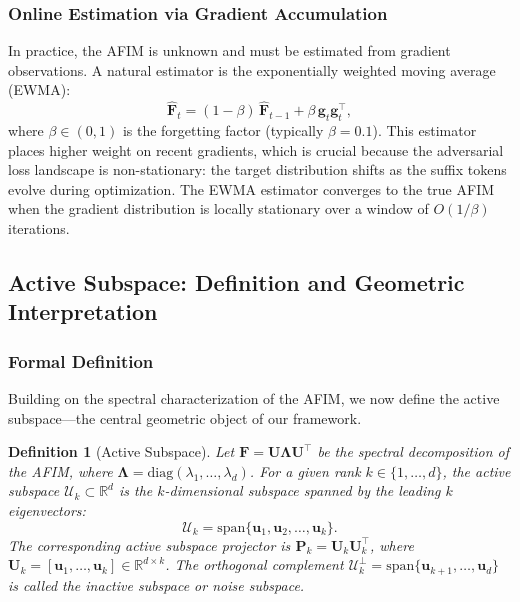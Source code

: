 \documentclass[preprint,12pt]{elsarticle}
\newtheorem{definition}{Definition}[section]
\begin{document}
\subsubsection{Online Estimation via Gradient Accumulation}

In practice, the AFIM is unknown and must be estimated from gradient observations. A natural estimator is the exponentially weighted moving average (EWMA):
\begin{equation}
\label{eq:ewma}
\hat{\mathbf{F}}_t = (1 - \beta) \, \hat{\mathbf{F}}_{t-1} + \beta \, \mathbf{g}_t \mathbf{g}_t^\top,
\end{equation}
where $\beta \in (0, 1)$ is the forgetting factor (typically $\beta = 0.1$). This estimator places higher weight on recent gradients, which is crucial because the adversarial loss landscape is non-stationary: the target distribution shifts as the suffix tokens evolve during optimization. The EWMA estimator converges to the true AFIM when the gradient distribution is locally stationary over a window of $O(1/\beta)$ iterations.

\subsection{Active Subspace: Definition and Geometric Interpretation}
\label{sec:active_subspace}

\subsubsection{Formal Definition}

Building on the spectral characterization of the AFIM, we now define the active subspace---the central geometric object of our framework.

\begin{definition}[Active Subspace]
\label{def:active_subspace}
Let $\mathbf{F} = \mathbf{U} \boldsymbol{\Lambda} \mathbf{U}^\top$ be the spectral decomposition of the AFIM, where $\boldsymbol{\Lambda} = \text{diag}(\lambda_1, \ldots, \lambda_d)$. For a given rank $k \in \{1, \ldots, d\}$, the \emph{active subspace} $\mathcal{U}_k \subset \mathbb{R}^d$ is the $k$-dimensional subspace spanned by the leading $k$ eigenvectors:
\begin{equation}
\label{eq:active_subspace}
\mathcal{U}_k = \text{span}\{\mathbf{u}_1, \mathbf{u}_2, \ldots, \mathbf{u}_k\}.
\end{equation}
The corresponding \emph{active subspace projector} is $\mathbf{P}_k = \mathbf{U}_k \mathbf{U}_k^\top$, where $\mathbf{U}_k = [\mathbf{u}_1, \ldots, \mathbf{u}_k] \in \mathbb{R}^{d \times k}$. The orthogonal complement $\mathcal{U}_k^\perp = \text{span}\{\mathbf{u}_{k+1}, \ldots, \mathbf{u}_d\}$ is called the \emph{inactive subspace} or \emph{noise subspace}.
\end{definition}
\end{document}
